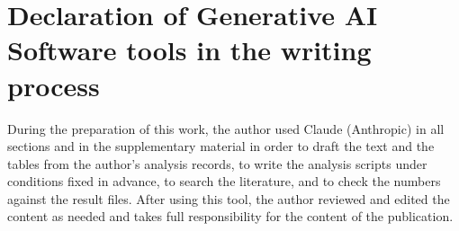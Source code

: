 \section*{Declaration of Generative AI Software tools in the writing process}

During the preparation of this work, the author used Claude (Anthropic) in all sections and in the supplementary
material in order to draft the text and the tables from the author's analysis records, to write the analysis scripts
under conditions fixed in advance, to search the literature, and to check the numbers against the result files. After
using this tool, the author reviewed and edited the content as needed and takes full responsibility for the content of
the publication.
